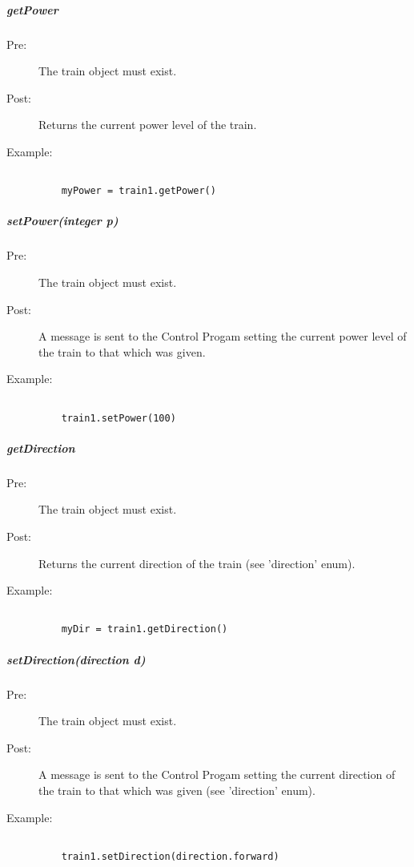 \documentclass[a4paper,11pt,notitlepage]{article}
\def\CS{Control Progam\xspace}
\begin{document}
\subparagraph{getPower} 
\begin{description}
\item[\hspace{1cm}Pre:] The train object must exist. 
\item[\hspace{1cm}Post:] Returns the current power level of the train.
\item[\hspace{1cm}Example:]
\begin{verbatim}

	myPower = train1.getPower()
\end{verbatim}
\end{description}


\subparagraph{setPower(integer p)} 
\begin{description}
\item[\hspace{1cm}Pre:] The train object must exist.
\item[\hspace{1cm}Post:] A message is sent to the \CS setting the current power level of the train to that which was given.
\item[\hspace{1cm}Example:]
\begin{verbatim}

	train1.setPower(100)
\end{verbatim}
\end{description}

\subparagraph{getDirection} 
\begin{description}
\item[\hspace{1cm}Pre:] The train object must exist. 
\item[\hspace{1cm}Post:] Returns the current direction of the train (see 'direction' enum).
\item[\hspace{1cm}Example:]
\begin{verbatim}

	myDir = train1.getDirection()    
\end{verbatim}
\end{description}

\subparagraph{setDirection(direction d)} 
\begin{description}
\item[\hspace{1cm}Pre:] The train object must exist. 
\item[\hspace{1cm}Post:] A message is sent to the \CS setting the current direction of the train to that which was given (see 'direction' enum).
\item[\hspace{1cm}Example:]
\begin{verbatim}

	train1.setDirection(direction.forward)
\end{verbatim}
\end{description}
\end{document}
